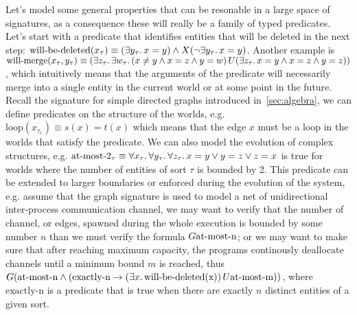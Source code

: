 \begin{example}
  Let's model some general properties that can be resonable in a large space of signatures, as a consequence these will
  really be a family of typed predicates. Let's start with a predicate that identifies entities that will be deleted in
  the next step: $\text{will-be-deleted}(x_\tau) \equiv (\exists {y_\tau} \ldotp {x = y}) \land X{(\neg\exists {y_\tau} \ldotp {x =
  y})}$. Another example is $\text{will-merge}(x_\tau, y_\tau) \equiv (\exists {z_\tau} \ldotp {\exists {w_\tau} \ldotp {{(x \neq
  y \land x = z \land y = w)}\,U {(\exists {z_\tau} \ldotp {x = y \land x = z \land y = z})}}})$, which intuitively means that the arguments of
  the predicate will necessarily merge into a single entity in the current world or at some point in the future.
  Recall the signature for simple directed graphs introduced in~\autoref{sec:algebra}, we can define predicates on the
  structure of the worlds, e.g. $\text{loop}(x_{\tau_e}) \equiv s(x) = t(x)$ which means that the edge $x$ must be a
  loop in the worlds that satisfy the predicate. We can also model the evolution of complex structures, e.g.
  $\text{at-most-2}_\tau \equiv \forall {x_\tau} \ldotp {\forall {y_\tau} \ldotp {\forall {z_\tau} \ldotp {x = y \lor y = z \lor z = x}}}$ is
  true for worlds where the number of entities of sort $\tau$ is bounded by 2. This predicate can be extended to larger
  boundaries or enforced during the evolution of the system, e.g. assume that the graph signature is used to model a net
  of unidirectional inter-process communication channel, we may want to verify that the number of channel, or edges,
  spawned during the whole execution is bounded by some number $n$ than we must verify the formula
  $G{\text{at-most-n}}$; or we may want to make sure that after reaching maximum capacity, the programs
  continously deallocate channels until a minimum bound $m$ is reached, thus $G{(\text{at-most-n} \land (\text{exactly-n} \to
  {(\exists {x} \ldotp {\text{will-be-deleted(x)}})}\,U {\text{at-most-m}}))}$, where $\text{exactly-n}$ is a predicate that
  is true when there are exactly $n$ distinct entities of a given sort.
\end{example}
